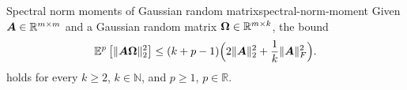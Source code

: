 \begin{lemma}{Spectral norm moments of Gaussian random matrix}{spectral-norm-moment}
    Given $\boldsymbol{A} \in \mathbb{R}^{m \times m}$ and a Gaussian random matrix $\boldsymbol{\Omega} \in \mathbb{R}^{m \times k}$, the bound
    \begin{equation}
        \mathbb{E}^{p}\left[ \lVert \boldsymbol{A} \boldsymbol{\Omega} \rVert _2^2 \right]
        \leq  (k + p-1) \Big( 2 \lVert \boldsymbol{A} \rVert _2^2 + \frac{1}{k} \lVert \boldsymbol{A} \rVert _F^2 \Big).
    \end{equation}
    holds for every $k \ge 2$, $k\in \mathbb{N}$, and $p \ge 1$, $p\in \mathbb R$.
\end{lemma}
